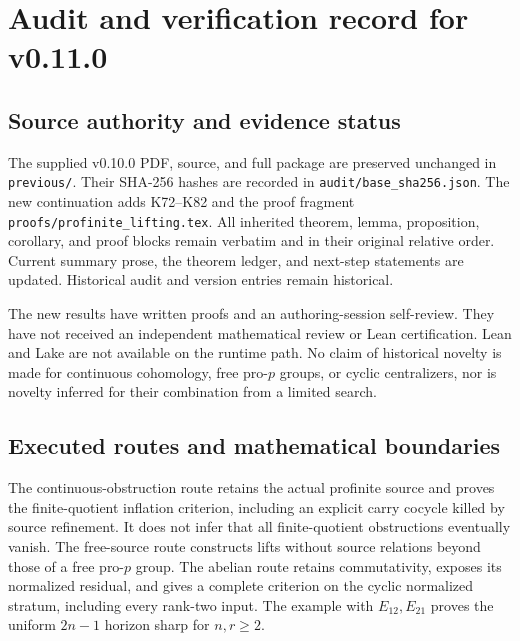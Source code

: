 \clearpage
\section{Audit and verification record for v0.11.0}\label{app:audit-v0110}

\subsection{Source authority and evidence status}
The supplied v0.10.0 PDF, source, and full package are preserved unchanged in \texttt{previous/}. Their SHA-256 hashes are recorded in \texttt{audit/base\_sha256.json}. The new continuation adds K72--K82 and the proof fragment \texttt{proofs/profinite\_lifting.tex}. All inherited theorem, lemma, proposition, corollary, and proof blocks remain verbatim and in their original relative order. Current summary prose, the theorem ledger, and next-step statements are updated. Historical audit and version entries remain historical.

The new results have written proofs and an authoring-session self-review. They have not received an independent mathematical review or Lean certification. Lean and Lake are not available on the runtime path. No claim of historical novelty is made for continuous cohomology, free pro-$p$ groups, or cyclic centralizers, nor is novelty inferred for their combination from a limited search.

\subsection{Executed routes and mathematical boundaries}
The continuous-obstruction route retains the actual profinite source and proves the finite-quotient inflation criterion, including an explicit carry cocycle killed by source refinement. It does not infer that all finite-quotient obstructions eventually vanish. The free-source route constructs lifts without source relations beyond those of a free pro-$p$ group. The abelian route retains commutativity, exposes its normalized residual, and gives a complete criterion on the cyclic normalized stratum, including every rank-two input. The example with $E_{12},E_{21}$ proves the uniform $2n-1$ horizon sharp for $n,r\geq2$.

